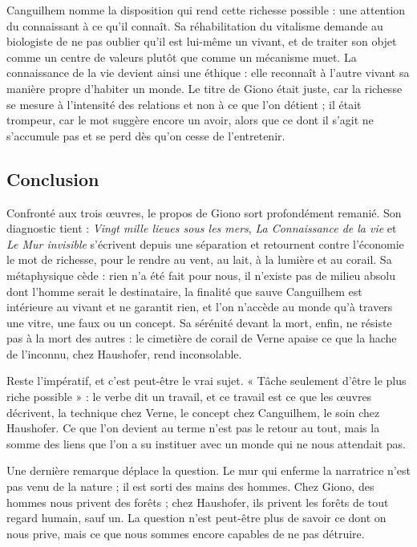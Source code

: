\documentclass[11pt,a4paper]{article}
\begin{document}
Canguilhem nomme la disposition qui rend cette richesse possible : une attention du connaissant à ce qu'il connaît. Sa réhabilitation du vitalisme demande au biologiste de ne pas oublier qu'il est lui-même un vivant, et de traiter son objet comme un centre de valeurs plutôt que comme un mécanisme muet. La connaissance de la vie devient ainsi une éthique : elle reconnaît à l'autre vivant sa manière propre d'habiter un monde. Le titre de Giono était juste, car la richesse se mesure à l'intensité des relations et non à ce que l'on détient ; il était trompeur, car le mot suggère encore un avoir, alors que ce dont il s'agit ne s'accumule pas et se perd dès qu'on cesse de l'entretenir.

\hypertarget{conclusion}{%
\subsection{Conclusion}\label{conclusion}}

Confronté aux trois œuvres, le propos de Giono sort profondément remanié. Son diagnostic tient : \emph{Vingt mille lieues sous les mers}, \emph{La Connaissance de la vie} et \emph{Le Mur invisible} s'écrivent depuis une séparation et retournent contre l'économie le mot de richesse, pour le rendre au vent, au lait, à la lumière et au corail. Sa métaphysique cède : rien n'a été fait pour nous, il n'existe pas de milieu absolu dont l'homme serait le destinataire, la finalité que sauve Canguilhem est intérieure au vivant et ne garantit rien, et l'on n'accède au monde qu'à travers une vitre, une faux ou un concept. Sa sérénité devant la mort, enfin, ne résiste pas à la mort des autres : le cimetière de corail de Verne apaise ce que la hache de l'inconnu, chez Haushofer, rend inconsolable.

Reste l'impératif, et c'est peut-être le vrai sujet. « Tâche seulement d'être le plus riche possible » : le verbe dit un travail, et ce travail est ce que les œuvres décrivent, la technique chez Verne, le concept chez Canguilhem, le soin chez Haushofer. Ce que l'on devient au terme n'est pas le retour au tout, mais la somme des liens que l'on a su instituer avec un monde qui ne nous attendait pas.

Une dernière remarque déplace la question. Le mur qui enferme la narratrice n'est pas venu de la nature ; il est sorti des mains des hommes. Chez Giono, des hommes nous privent des forêts ; chez Haushofer, ils privent les forêts de tout regard humain, sauf un. La question n'est peut-être plus de savoir ce dont on nous prive, mais ce que nous sommes encore capables de ne pas détruire.
\end{document}

